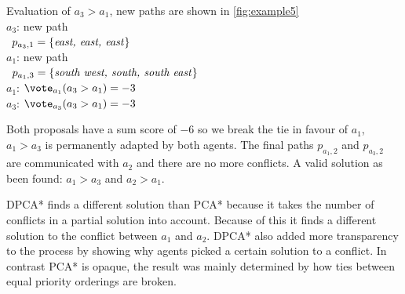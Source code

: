  Evaluation of $a_3 > a_1$, new paths are shown in \autoref{fig:example5}
\\ \-\qquad $a_3$: new path
\\ \-\qquad\quad\,\; $p_{a_3,1} = \{\text{\emph{east, east, east}}\}$
\\ \-\qquad $a_1$: new path
\\ \-\qquad\quad\,\; $p_{a_1,3} = \{\text{\emph{south west, south, south 
east}}\}$
\\ \-\qquad $a_1$: $\vote_{a_1}(a_3 > a_1) = -3$
\\ \-\qquad $a_3$: $\vote_{a_3}(a_3 > a_1) = -3$

Both proposals have a sum score of $-6$ so we break the tie in favour of $a_1$, 
$a_1 > 
a_3$ is permanently adapted by both agents. The final paths $p_{a_1,2}$ and 
$p_{a_3,2}$ are communicated with $a_2$ and there are no more conflicts. A 
valid solution as been found: $a_1 > a_3$ and $a_2 > a_1$.

DPCA* finds a different solution than PCA* because it takes the number of 
conflicts in a partial solution into account. Because of this it finds a 
different solution to the conflict between $a_1$ and $a_2$. DPCA* also added 
more transparency to the process by showing why agents picked a certain 
solution to a conflict. In contrast PCA* is opaque, the result was mainly 
determined by how ties between equal priority orderings are broken.

